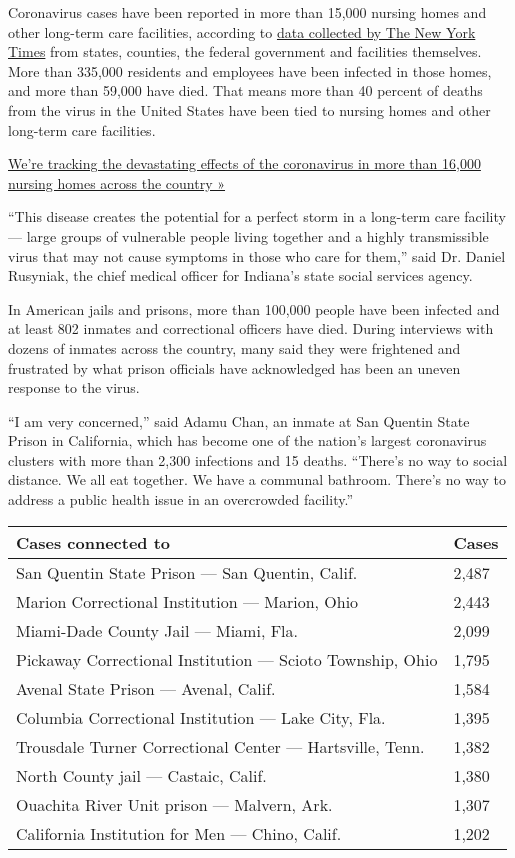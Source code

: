 Coronavirus cases have been reported in more than 15,000 nursing homes
and other long-term care facilities, according to
\href{https://www.nytimes.com/interactive/2020/us/coronavirus-nursing-homes.html}{data
collected by The New York Times} from states, counties, the federal
government and facilities themselves. More than 335,000 residents and
employees have been infected in those homes, and more than 59,000 have
died. That means more than 40 percent of deaths from the virus in the
United States have been tied to nursing homes and other long-term care
facilities.

\href{https://www.nytimes.com/interactive/2020/us/coronavirus-nursing-homes.html}{We're
tracking the devastating effects of the coronavirus in more than 16,000
nursing homes across the country »}

``This disease creates the potential for a perfect storm in a long-term
care facility --- large groups of vulnerable people living together and
a highly transmissible virus that may not cause symptoms in those who
care for them,'' said Dr. Daniel Rusyniak, the chief medical officer for
Indiana's state social services agency.

In American jails and prisons, more than 100,000 people have been
infected and at least 802 inmates and correctional officers have died.
During interviews with dozens of inmates across the country, many said
they were frightened and frustrated by what prison officials have
acknowledged has been an uneven response to the virus.

``I am very concerned,'' said Adamu Chan, an inmate at San Quentin State
Prison in California, which has become one of the nation's largest
coronavirus clusters with more than 2,300 infections and 15 deaths.
``There's no way to social distance. We all eat together. We have a
communal bathroom. There's no way to address a public health issue in an
overcrowded facility.''

\begin{longtable}[]{@{}ll@{}}
\toprule
Cases connected to & Cases\tabularnewline
\midrule
\endhead
San Quentin State Prison --- San Quentin, Calif. & 2,487 \tabularnewline
Marion Correctional Institution --- Marion, Ohio & 2,443 \tabularnewline
Miami-Dade County Jail --- Miami, Fla. & 2,099 \tabularnewline
Pickaway Correctional Institution --- Scioto Township, Ohio & 1,795
\tabularnewline
Avenal State Prison --- Avenal, Calif. & 1,584 \tabularnewline
Columbia Correctional Institution --- Lake City, Fla. & 1,395
\tabularnewline
Trousdale Turner Correctional Center --- Hartsville, Tenn. & 1,382
\tabularnewline
North County jail --- Castaic, Calif. & 1,380 \tabularnewline
Ouachita River Unit prison --- Malvern, Ark. & 1,307 \tabularnewline
California Institution for Men --- Chino, Calif. & 1,202 \tabularnewline
\bottomrule
\end{longtable}


